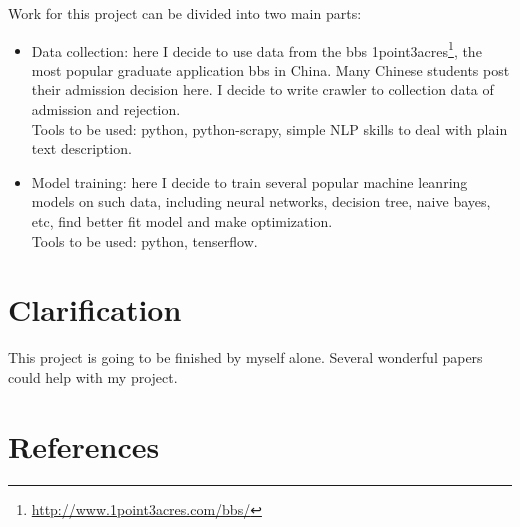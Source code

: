 \documentclass{article}
\begin{document}
Work for this project can be divided into two main parts:

\begin{itemize}
    \item Data collection: here I decide to use data from the bbs 1point3acres\footnote{\url{http://www.1point3acres.com/bbs/}}, the most popular graduate application bbs in China. Many Chinese students post their admission decision here. I decide to write crawler to collection data of admission and rejection.\\
    Tools to be used: python, python-scrapy, simple NLP skills to deal with plain text description.
    \item Model training: here I decide to train several popular machine leanring models on such data, including neural networks, decision tree, naive bayes, etc, find better fit model and make optimization.\\
    Tools to be used: python, tenserflow.
\end{itemize}

\section{Clarification}

This project is going to be finished by myself alone. Several wonderful papers could help with my project.

\section*{References}



\end{document}
